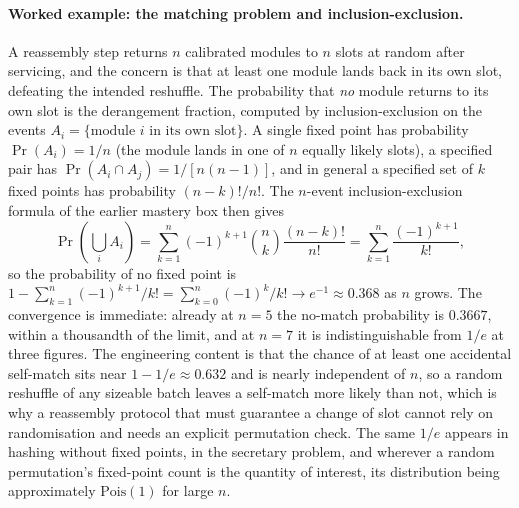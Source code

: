 \paragraph{Worked example: the matching problem and inclusion-exclusion.}
A reassembly step returns $n$ calibrated modules to $n$ slots at random
after servicing, and the concern is that at least one module lands back
in its own slot, defeating the intended reshuffle. The probability that
\emph{no} module returns to its own slot is the derangement fraction,
computed by inclusion-exclusion on the events $A_{i} = \{\text{module }i
\text{ in its own slot}\}$. A single fixed point has probability
$\Pr(A_{i}) = 1/n$ (the module lands in one of $n$ equally likely slots),
a specified pair has $\Pr(A_{i} \cap A_{j}) = 1/[n(n-1)]$, and in general
a specified set of $k$ fixed points has probability $(n-k)!/n!$. The
$n$-event inclusion-exclusion formula of the earlier mastery box then
gives
\[
\Pr\!\left(\bigcup_{i} A_{i}\right)
= \sum_{k=1}^{n} (-1)^{k+1} \binom{n}{k}\frac{(n-k)!}{n!}
= \sum_{k=1}^{n} \frac{(-1)^{k+1}}{k!},
\]
so the probability of no fixed point is $1 - \sum_{k=1}^{n}
(-1)^{k+1}/k! = \sum_{k=0}^{n} (-1)^{k}/k! \to e^{-1} \approx 0.368$ as
$n$ grows. The convergence is immediate: already at $n = 5$ the
no-match probability is $0.3667$, within a thousandth of the limit, and
at $n = 7$ it is indistinguishable from $1/e$ at three figures. The
engineering content is that the chance of at least one accidental
self-match sits near $1 - 1/e \approx 0.632$ and is nearly independent of
$n$, so a random reshuffle of any sizeable batch leaves a self-match more
likely than not, which is why a reassembly protocol that must guarantee a
change of slot cannot rely on randomisation and needs an explicit
permutation check. The same $1/e$ appears in hashing without fixed
points, in the secretary problem, and wherever a random permutation's
fixed-point count is the quantity of interest, its distribution being
approximately $\mathrm{Pois}(1)$ for large $n$.

